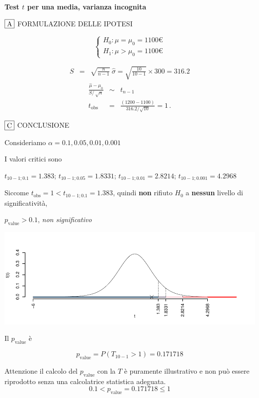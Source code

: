 \documentclass[
  11pt,
]{book}
\theoremstyle{mytheoremstyle}
\theoremstyle{mydefstyle}
\newenvironment{sol}
  {
  \begin{tcolorbox}[enhanced,breakable,arc=0.1mm,boxrule=1pt,colback=white,colframe=iblue,
  title=\bf \fontfamily{lmss}\selectfont \hspace{.5 cm} Soluzione,drop fuzzy shadow]

}{
\end{tcolorbox}
  }
\begin{document}
\begin{sol}
\textbf{Test \(t\) per una media, varianza incognita}

\(\fbox{A}\) FORMULAZIONE DELLE IPOTESI

\[\begin{cases}
   H_0: \mu = \mu_0=1100€ \\
   H_1: \mu > \mu_0=1100€ 
   \end{cases}\]

\begin{eqnarray*}
   S    &=& \sqrt{\frac{n} {n-1}}\ \widehat{\sigma} 
   =  \sqrt{\frac{ 10 } { 10 -1}} \times  300  =  316.2 
   \end{eqnarray*}
\begin{eqnarray*}
   \frac{\hat\mu - \mu_{0}} {S/\,\sqrt{n}}&\sim&t_{n-1}\\
   t_{\text{obs}}
   &=& \frac{ ( 1200 -  1100 )} { 316.2 /\sqrt{ 10 }}
   =   1 \, .
   \end{eqnarray*}

\(\fbox{C}\) CONCLUSIONE

Consideriamo \(\alpha=0.1, 0.05, 0.01, 0.001\)

I valori critici sono

\(t_{10-1;0.1}=1.383\); \(t_{10-1;0.05}=1.8331\); \(t_{10-1;0.01}=2.8214\); \(t_{10-1;0.001}=4.2968\)

Siccome \(t_\text{obs}=1<t_{10-1;0.1}=1.383\), quindi \textbf{non} rifiuto \(H_0\) a \textbf{nessun} livello di significatività,

\(p_\text{value}>0.1\), \emph{non significativo}

\begin{center}\includegraphics{Esami_passati_con_soluzioni_files/figure-latex/2023-88,-1} \end{center}

Il \(p_{\text{value}}\) è

\[ p_{\text{value}} = P(T_{10-1}>1)=0.171718 \]

Attenzione il calcolo del \(p_\text{value}\) con la \(T\) è puramente illustrativo e non può essere riprodotto senza una calcolatrice statistica adeguata.\[
 0.1 < p_\text{value}= 0.171718 \leq 1 
\]

\end{sol}
\end{document}
